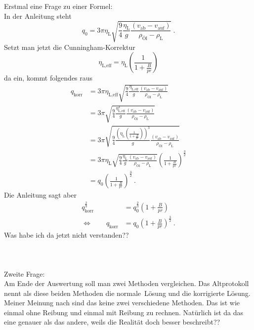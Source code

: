 \documentclass[a4,11pt]{article}
\begin{document}
Erstmal eine Frage zu einer Formel: \\
In der Anleitung steht
\[ q_0 = 3\pi\eta_\text{L}\sqrt{\frac{9}{4}\frac{\eta_\text{L}}{g}\frac{(v_\text{ab}-v_\text{auf})}{\rho_\text{Öl}-\rho_\text{L}}} \ . \]
Setzt man jetzt die Cunningham-Korrektur
\[ \eta_\text{L,eff} = \eta_\text{L}\left( \frac{1}{1+\frac{B}{pr}} \right) \]
da ein, kommt folgendes raus
\begin{align}
	q_\text{korr} &= 3\pi\eta_\text{L,eff}\sqrt{\frac{9}{4}\frac{\eta_\text{L,eff}}{g}\frac{(v_\text{ab}-v_\text{auf})}{\rho_\text{Öl}-\rho_\text{L}}} \\
	&= 3\pi\sqrt{\frac{9}{4}\frac{\eta^3_\text{L,eff}}{g}\frac{(v_\text{ab}-v_\text{auf})}{\rho_\text{Öl}-\rho_\text{L}}} \\
	&= 3\pi\sqrt{\frac{9}{4}\frac{\left( \eta_\text{L}\left( \frac{1}{1+\frac{B}{pr}} \right) \right)^3}{g}\frac{(v_\text{ab}-v_\text{auf})}{\rho_\text{Öl}-\rho_\text{L}}} \\
	&= 3\pi\eta_\text{L}\sqrt{\frac{9}{4}\frac{\eta_\text{L}}{g}\frac{(v_\text{ab}-v_\text{auf})}{\rho_\text{Öl}-\rho_\text{L}}} \left( \frac{1}{1+\frac{B}{pr}} \right)^\frac{3}{2} \\
	&= q_0 \left( \frac{1}{1+\frac{B}{pr}} \right)^\frac{3}{2} \ .
\end{align}
Die Anleitung sagt aber
\begin{align}
	q_\text{korr}^\frac{2}{3} &= q_0^\frac{2}{3}\left( 1+\frac{B}{pr} \right) \\
	\Leftrightarrow\qquad q_\text{korr} &= q_0\left( 1+\frac{B}{pr} \right)^\frac{3}{2} \ .
\end{align}
Was habe ich da jetzt nicht verstanden?? \\
\ \\
\ \\
\ \\
Zweite Frage: \\
Am Ende der Auswertung soll man zwei Methoden vergleichen. Das Altprotokoll nennt als diese beiden Methoden die \glqq normale\grqq\ Lösung und die korrigierte Lösung. Meiner Meinung nach sind das keine zwei verschiedene Methoden. Das ist wie einmal ohne Reibung und einmal mit Reibung zu rechnen. Natürlich ist da das eine genauer als das andere, weils die Realität doch besser beschreibt??
\end{document}

